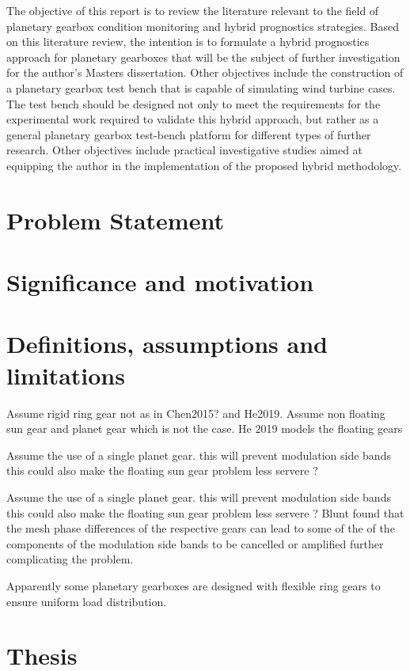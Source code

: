The objective of this report is to review the literature relevant to the field of planetary gearbox condition monitoring and hybrid prognostics strategies. Based on this literature review, the intention is to formulate a hybrid prognostics approach for planetary gearboxes that will be the subject of further investigation for the author's Masters dissertation. Other objectives include the construction of a planetary gearbox test bench that is capable of simulating wind turbine cases. The test bench should be designed not only to meet the requirements for the experimental work required to validate this hybrid approach, but rather as a general planetary gearbox test-bench platform for different types of further research. Other objectives include practical investigative studies aimed at equipping the author in the implementation of the proposed hybrid methodology.


\section{Problem Statement}


\section{Significance and motivation}


\section{Definitions, assumptions and limitations}
Assume rigid ring gear not as in Chen2015? and He2019. Assume non floating sun gear and planet gear which is not the case. He 2019 models the floating gears


Assume the use of a single planet gear. this will prevent modulation side bands this could also make the floating sun gear problem less servere ?


Assume the use of a single planet gear. this will prevent modulation side bands this could also make the floating sun gear problem less servere ?
Blunt found that the mesh phase differences of the respective gears can lead to some of the of the components of the modulation side bands to be cancelled or amplified further complicating the problem.

Apparently some planetary gearboxes are designed with flexible ring gears to ensure uniform load distribution.
\section{Thesis}

